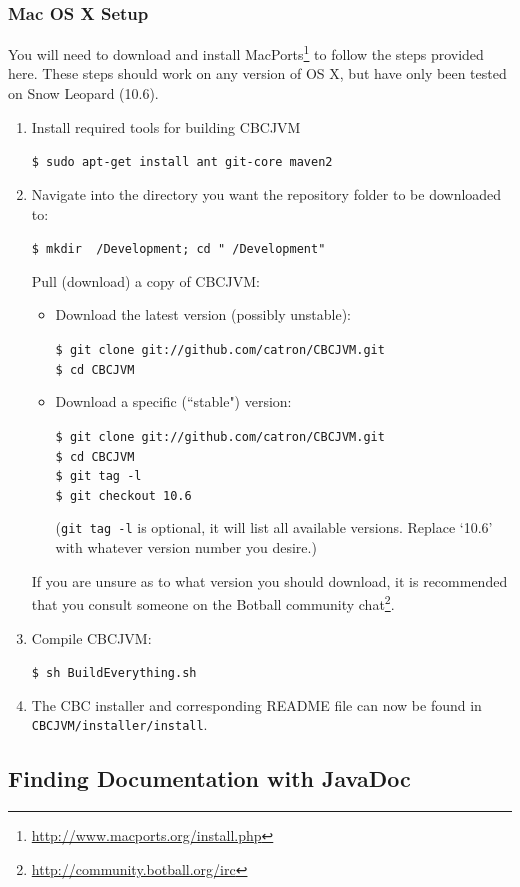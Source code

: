 \documentclass[10pt,letterpaper]{article}
\newcommand{\urlfootnote}[1]{\footnote{\url{#1}}}
\newcommand{\code}[1]{\par\texttt{#1}\par}
\begin{document}
\subsubsection{Mac OS X Setup}

You will need to download and install MacPorts\urlfootnote{http://www.macports.org/install.php} to follow the steps provided here. These steps should work on any version of OS X, but have only been tested on Snow Leopard (10.6).
\begin{enumerate}
\item Install required tools for building CBCJVM
      \code{\$ sudo apt-get install ant git-core maven2}
\item Navigate into the directory you want the repository folder to be downloaded to:
      \code{\$ mkdir ~/Development; cd "~/Development"}
      Pull (download) a copy of CBCJVM:\par
      \begin{itemize}
          \item Download the latest version (possibly unstable):
                \code{\$ git clone git://github.com/catron/CBCJVM.git \\
                      \$ cd CBCJVM}
          \item Download a specific (``stable") version:
                \code{\$ git clone git://github.com/catron/CBCJVM.git \\
                      \$ cd CBCJVM \\
                      \$ git tag -l \\
                      \$ git checkout 10.6}
                (\texttt{git tag -l} is optional, it will list all available versions. Replace `10.6' with whatever version number you desire.)
      \end{itemize}
      If you are unsure as to what version you should download, it is recommended that you consult someone on the Botball community chat\urlfootnote{http://community.botball.org/irc}.
\item Compile CBCJVM:
      \code{\$ sh BuildEverything.sh}
\item The CBC installer and corresponding README file can now be found in \texttt{CBCJVM/installer/install}.
\end{enumerate}


\subsection{Finding Documentation with JavaDoc}
\end{document}
